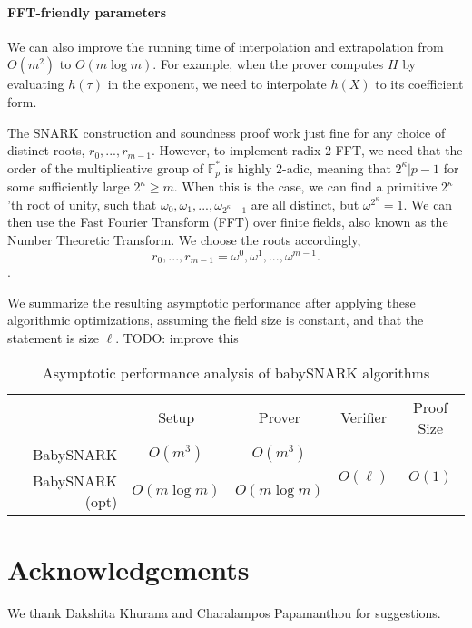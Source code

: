 \documentclass{article}
\theoremstyle{definition}
\theoremstyle{remark}
\newcommand{\F}{\mathbb{F}}
\begin{document}
\paragraph{FFT-friendly parameters}
We can also improve the running time of interpolation and extrapolation from $O(m^2)$ to $O(m \log m)$. For example, when the prover computes $H$ by evaluating $h(\tau)$ in the exponent, we need to interpolate $h(X)$ to its coefficient form. 

The SNARK construction and soundness proof work just fine for any choice of distinct roots, $r_0,...,r_{m-1}$. However, to implement radix-2 FFT, we need that the order of the multiplicative group of $\F_p^*$ is highly 2-adic, meaning that $2^\kappa|p-1$ for some sufficiently large $2^\kappa \ge m$. 
When this is the case, we can find a primitive $2^\kappa$'th root of unity, such that $\omega_0,\omega_1,...,\omega_{2^\kappa-1}$ are all distinct, but $\omega^{2^\kappa}=1$. We can then use the Fast Fourier Transform (FFT) over finite fields, also known as the Number Theoretic Transform.
We choose the roots accordingly,
\[
r_0,...,r_{m-1} = \omega^0,\omega^1,...,\omega^{m-1}.
\].

We summarize the resulting asymptotic performance after applying these algorithmic optimizations, assuming the field size is constant, and that the statement is size $\ell$.
TODO: improve this
\begin{table*}[h]
    \centering
    \begin{tabular}{r|c|c|c|c|}
         & Setup & Prover & Verifier & Proof Size \\
         BabySNARK    & $O(m^3)$ & $O(m^3)$ & \multirow{2}{*}{$O(\ell)$} & \multirow{2}{*}{$O(1)$} \\
         BabySNARK (opt) & $O(m \log m)$ & $O(m \log m)$ & & \\
    \end{tabular}
    \caption{Asymptotic performance analysis of babySNARK algorithms}
    \label{tbl:asymptotics}
\end{table*}

\section*{Acknowledgements}
We thank Dakshita Khurana and Charalampos Papamanthou for suggestions.



\end{document}
